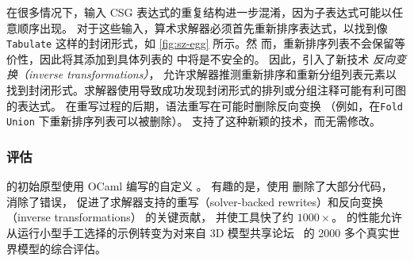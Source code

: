 在很多情况下，输入 CSG 表达式的重复结构进一步混淆，因为子表达式可能以任意顺序出现。
对于这些输入，算术求解器必须首先重新排序表达式，以找到像 \texttt{Tabulate} 这样的封闭形式，如 \autoref{fig:sz-egg} 所示。然
而，重新排序列表不会保留等价性，因此将其添加到具体列表的 \eclass 中将是不安全的。
因此，\sz 引入了新技术 \textit{反向变换（inverse transformations）}，
  允许求解器推测重新排序和重新分组列表元素以找到封闭形式。求解器使用导致成功发现封闭形式的排列或分组注释可能有利可图的表达式。
在重写过程的后期，语法重写在可能时删除反向变换
  （例如，在\texttt{Fold Union} 下重新排序列表可以被删除）。
\egg 支持了这种新颖的技术，而无需修改。

\subsubsection{评估}

\sz 的初始原型使用 OCaml 编写的自定义 \egraph。
有趣的是，使用 \egg 删除了大部分代码，
  消除了错误，
  促进了求解器支持的重写（solver-backed rewrites）和反向变换（inverse transformations）
  的关键贡献， 
  并使工具快了约 $1000 \times$。
\egg 的性能允许从运行小型手工选择的示例转变为对来自 3D 模型共享论坛~\cite{szalinski}
  的 2000 多个真实世界模型的综合评估。


